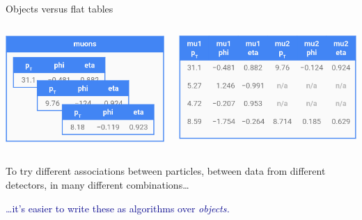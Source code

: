 \documentclass[aspectratio=169]{beamer}
\begin{document}
\begin{frame}{Objects versus flat tables}
\vspace{0.5 cm}
\begin{columns}[b]
\includegraphics[width=\linewidth]{muons-as-objects.png}

\includegraphics[width=\linewidth]{muons-as-a-table.png}
\vspace{0.61 cm}
\end{columns}

\vspace{0.2 cm}
To try different associations between particles, between data from different detectors, in many different combinations\ldots

\vspace{0.2 cm}
\hfill \textcolor{darkblue}{\ldots it's easier to write these as algorithms over {\it objects.}}
\end{frame}
\end{document}
